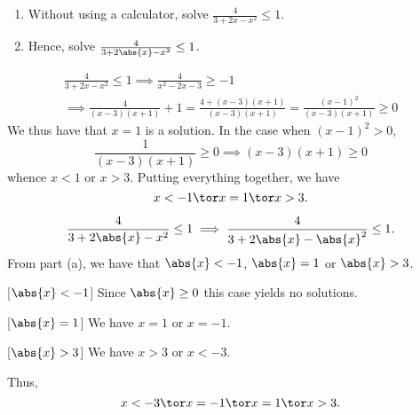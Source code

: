 \begin{problem}
    \begin{enumerate}
        \item Without using a calculator, solve $\frac4{3+2x-x^2} \leq 1$.
        \item Hence, solve $\frac4{3+2\abs{x}-x^2} \leq 1$.
    \end{enumerate}
\end{problem}
\clearpage
\begin{solution}
    \begin{ppart}
        \begin{gather*}
            \frac4{3+2x-x^2} \leq 1 \implies \frac4{x^2-2x-3} \geq -1\\
            \implies \frac4{(x-3)(x+1)} + 1 = \frac{4 + (x-3)(x+1)}{(x-3)(x+1)} = \frac{(x-1)^2}{(x-3)(x+1)} \geq 0
        \end{gather*}
        We thus have that $x = 1$ is a solution. In the case when $(x-1)^2 > 0$, \[\frac1{(x-3)(x+1)} \geq 0 \implies (x-3)(x+1) \geq 0\] whence $x < 1$ or $x > 3$. Putting everything together, we have \[x < -1 \tor x = 1 \tor x > 3.\]
    \end{ppart}
    \begin{ppart}
        \[\frac4{3+2\abs{x}-x^2} \leq 1 \implies \frac4{3+2\abs{x}-\abs{x}^2} \leq 1.\] From part (a), we have that $\abs{x} < -1$, $\abs{x} = 1$ or $\abs{x} > 3$.

        [$\abs{x} < -1$] Since $\abs{x} \geq 0$ this case yields no solutions.
        
        [$\abs{x} = 1$] We have $x = 1$ or $x = -1$.

        [$\abs{x} > 3$] We have $x > 3$ or $x < -3$.

        Thus, \[x < -3 \tor x = -1 \tor x = 1 \tor x > 3.\]
    \end{ppart}
\end{solution}

